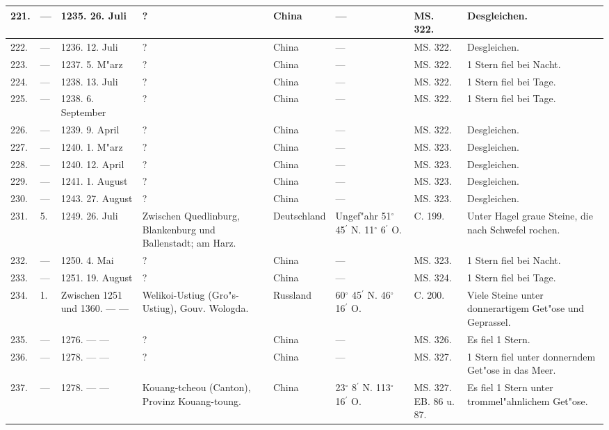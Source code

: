 \documentclass[a4paper, 8pt, oneside, polutonikogreek, german]{article}
\begin{document}
\begin{center}
\begin{longtable}{| p{4mm} | p{2mm} | p{15mm} | p{25mm} | p{16mm} | p{12mm} | p{13mm} | p{20mm} |}
        221. & --- & 1235. 26. Juli & ? & China & --- & MS. 322. & Desgleichen. \\ \hline
        222. & --- & 1236. 12. Juli & ? & China & --- & MS. 322. & Desgleichen. \\ \hline
        223. & --- & 1237. 5. M"arz & ? & China & --- & MS. 322. & 1 Stern fiel bei Nacht. \\ \hline
        224. & --- & 1238. 13. Juli & ? & China & --- & MS. 322. & 1 Stern fiel bei Tage. \\ \hline
        225. & --- & 1238. 6. September & ? & China & --- & MS. 322. & 1 Stern fiel bei Tage. \\ \hline
        226. & --- & 1239. 9. April & ? & China & --- & MS. 322. & Desgleichen. \\ \hline
        227. & --- & 1240. 1. M"arz & ? & China & --- & MS. 323. & Desgleichen. \\ \hline
        228. & --- & 1240. 12. April & ? & China & --- & MS. 323. & Desgleichen. \\ \hline
        229. & --- & 1241. 1. August & ? & China & --- & MS. 323. & Desgleichen. \\ \hline
        230. & --- & 1243. 27. August & ? & China & --- & MS. 323. & Desgleichen. \\ \hline
        231. & 5. & 1249. 26. Juli & Zwischen Quedlinburg, Blankenburg und Ballenstadt; am Harz. & Deutschland & Ungef"ahr 51$^\circ$ 45$^\prime$ N. 11$^\circ$ 6$^\prime$ O. & C. 199. & Unter Hagel graue Steine, die nach Schwefel rochen. \\ \hline
        232. & --- & 1250. 4. Mai & ? & China & --- & MS. 323. & 1 Stern fiel bei Nacht. \\ \hline
        233. & --- & 1251. 19. August & ? & China & --- & MS. 324. & 1 Stern fiel bei Tage. \\ \hline
        234. & 1. & Zwischen 1251 und 1360. --- --- & Welikoi-Ustiug (Gro"s-Ustiug), Gouv. Wologda. & Russland & 60$^\circ$ 45$^\prime$ N. 46$^\circ$ 16$^\prime$ O. & C. 200. & Viele Steine unter donnerartigem Get"ose und Geprassel. \\ \hline
        235. & --- & 1276. --- --- & ? & China & --- & MS. 326. & Es fiel 1 Stern. \\ \hline
        236. & --- & 1278. --- --- & ? & China & --- & MS. 327. & 1 Stern fiel unter donnerndem Get"ose in das Meer. \\ \hline
        237. & --- & 1278. --- --- & Kouang-tcheou (Canton), Provinz Kouang-toung. & China & 23$^\circ$ 8$^\prime$ N. 113$^\circ$ 16$^\prime$ O. & MS. 327. EB. 86 u. 87. & Es fiel 1 Stern unter trommel"ahnlichem Get"ose. \\ \hline

\end{longtable}
\end{center}
\end{document}
